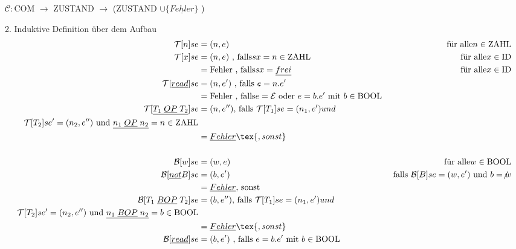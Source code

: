 \begin{compactitem}
\begin{compactitem}
		$\mathcal{C}:$COM $\rightarrow $ ZUSTAND $\rightarrow$ (ZUSTAND $\cup \{\underline{Fehler} \}$ )\\
		\item[2.] Induktive Definition über dem Aufbau\\
		\begin{align*}
		\mathcal{T}[n] s e &= (n,e) &\text{für alle} n \in \text{ZAHL}\\
		\mathcal{T}[x] s e &= (n,e)\text{ , falls} s x = n \in \text{ZAHL} &\text{für alle} x \in \text{ID}\\
		 &= \text{Fehler , falls} s x = \underline{frei}  &\text{für alle} x \in \text{ID}\\
		\mathcal{T}[\underline{read}] s e &= (n,e')\text{ , falls } e = n.e'\\
		&= \text{Fehler , falls} e = \mathcal{E} \text{ oder } e = b.e' \text{ mit } b \in \text{BOOL}\\
		\mathcal{T}[\underline{T_1 \; \underline{OP}\; T_2}] s e &= (n,e'') \text{, falls } \mathcal{T} [T_1] s e = (n_1,e') und \\  \mathcal{T} [T_2] s e' = (n_2,e'') \text{ und } \underline{n_1\;\underline{OP}\;n_2} = n \in \text{ZAHL}\\
		&= \underline{Fehler}\tex{, sonst}\\
		\\
		\mathcal{B}[w] s e &= (w,e) &\text{für alle} w \in \text{BOOL}\\
		\mathcal{B}[\underline{not}B] s e &= (b,e') &\text{ falls } \mathcal{B}[B]s e = (w, e') \text{ und } b = \not w\\
		&=\underline{Fehler}\text{, sonst}\\
		\mathcal{B}[T_1\;\underline{BOP}\;T_2] s e &= (b,e'') \text{, falls } \mathcal{T} [T_1] s e = (n_1,e') und \\  \mathcal{T} [T_2] s e' = (n_2,e'') \text{ und } \underline{n_1\;\underline{BOP}\;n_2} = b \in \text{BOOL}\\
		&= \underline{Fehler}\tex{, sonst}\\
		\mathcal{B}[\underline{read}] s e &= (b,e')\text{ , falls } e = b.e' \text{ mit } b \in \text{BOOL}\\

\end{align*}
\end{compactitem}
\end{compactitem}
